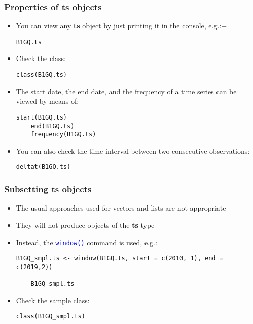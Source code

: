 \documentclass[10pt]{beamer}
\newcommand{\cc}[1]{\texttt{\textcolor{blue}{#1}}}
\theoremstyle{definition}
\begin{document}
\begin{frame}[fragile]
\frametitle{Properties of \textbf{ts} objects}
\begin{itemize}
	\item You can view any \textbf{ts} object by just printing it in the console, e.g.:+
	
	\begin{lstlisting}[style = rstyle, breaklines]
	B1GQ.ts
	\end{lstlisting}
	
	\item Check the class:
	
	\begin{lstlisting}[style = rstyle, breaklines]
	class(B1GQ.ts)
	\end{lstlisting}
	
	\item The start date, the end date, and the frequency of a time series can be viewed by means of:
	
	\begin{lstlisting}[style = rstyle, breaklines]
	start(B1GQ.ts)
	end(B1GQ.ts)
	frequency(B1GQ.ts)
	\end{lstlisting}
	
	\item You can also check the time interval between two consecutive observations:
	
	\begin{lstlisting}[style = rstyle, breaklines]
	deltat(B1GQ.ts)
	\end{lstlisting}
\end{itemize}
\end{frame}

\begin{frame}[fragile]
\frametitle{Subsetting \textbf{ts} objects}
\begin{itemize}
	\item The usual approaches used for vectors and lists are not appropriate
	\item They will not produce objects of the \textbf{ts} type
	\item Instead, the \cc{window()} command is used, e.g.:
	
	\begin{lstlisting}[style = rstyle, breaklines]
	B1GQ_smpl.ts <- window(B1GQ.ts, start = c(2010, 1), end = c(2019,2))
	
	B1GQ_smpl.ts
	\end{lstlisting}
	
	\item Check the sample class:
	\begin{lstlisting}[style = rstyle, breaklines]
	class(B1GQ_smpl.ts)
	\end{lstlisting}
\end{itemize}
\end{frame}
\end{document}
